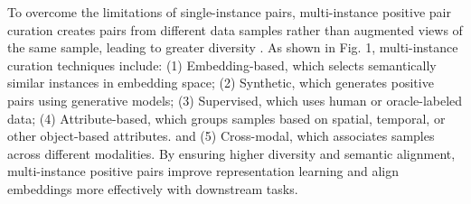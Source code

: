 
To overcome the limitations of single-instance pairs, multi-instance positive pair curation creates pairs from different data samples rather than augmented views of the same sample, leading to greater diversity \cite{dwibedi2021little}. As shown in Fig. 1, multi-instance curation techniques include: (1) Embedding-based, which selects semantically similar instances in embedding space; (2) Synthetic, which generates positive pairs using generative models; (3) Supervised, which uses human or oracle-labeled data; (4) Attribute-based, which groups samples based on spatial, temporal, or other object-based attributes.  and (5) Cross-modal, which associates samples across different modalities.  By ensuring higher diversity and semantic alignment, multi-instance positive pairs improve representation learning and align embeddings more effectively with downstream tasks.

